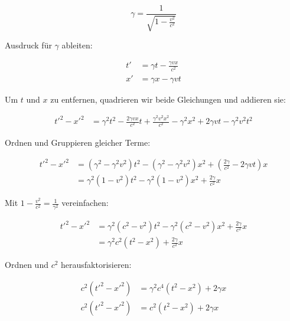 \documentclass[a4paper]{report}
\begin{document}
\[ \gamma = \frac{1}{\sqrt{1 - \frac{v^2}{c^2}}} \]

\begin{flushleft}
	Ausdruck für \( \gamma \) ableiten:
\end{flushleft}

\begin{align*}
t' &= \gamma t - \frac{\gamma vx}{c^2} \\
x' &= \gamma x - \gamma vt
\end{align*}

\begin{flushleft}
	Um \( t \) und \( x \) zu entfernen, quadrieren wir beide Gleichungen und addieren sie:
\end{flushleft}

\begin{align*}
t'^2 - x'^2 &= \gamma^2 t^2 - \frac{2\gamma vx}{c^2} t + \frac{\gamma^2 v^2 x^2}{c^2} - \gamma^2 x^2 + 2\gamma vt - \gamma^2 v^2 t^2
\end{align*}

\begin{flushleft}
	Ordnen und Gruppieren gleicher Terme:
\end{flushleft}

\begin{align*}
t'^2 - x'^2 &= (\gamma^2 - \gamma^2 v^2) t^2 - (\gamma^2 - \gamma^2 v^2) x^2 + (\frac{2\gamma}{c^2} - 2\gamma vt) x \\
&= \gamma^2 (1 - v^2) t^2 - \gamma^2 (1 - v^2) x^2 + \frac{2\gamma}{c^2} x
\end{align*}

\begin{flushleft}
	Mit \( 1 - \frac{v^2}{c^2} = \frac{1}{\gamma^2} \) vereinfachen:
\end{flushleft}

\begin{align*}
t'^2 - x'^2 &= \gamma^2 (c^2 - v^2) t^2 - \gamma^2 (c^2 - v^2) x^2 + \frac{2\gamma}{c^2} x \\
&= \gamma^2 c^2 (t^2 - x^2) + \frac{2\gamma}{c^2} x
\end{align*}

\begin{flushleft}
	Ordnen und \( c^2 \) herausfaktorisieren:
\end{flushleft}

\begin{align*}
c^2 (t'^2 - x'^2) &= \gamma^2 c^4 (t^2 - x^2) + 2\gamma x \\
c^2 (t'^2 - x'^2) &= c^2 (t^2 - x^2) + 2\gamma x
\end{align*}
\end{document}
